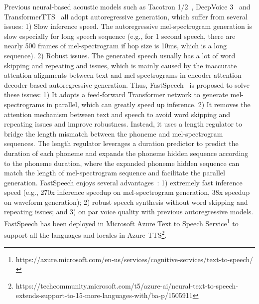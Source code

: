 \documentclass{article}
\begin{document}
Previous neural-based acoustic models such as Tacotron 1/2~\cite{wang2017tacotron,shen2018natural}, DeepVoice 3~\cite{ping2018deep} and TransformerTTS~\cite{li2019neural} all adopt autoregressive generation, which suffer from several issues: 1) Slow inference speed. The autoregressive mel-spectrogram generation is slow especially for long speech sequence (e.g., for 1 second speech, there are nearly 500 frames of mel-spectrogram if hop size is 10ms, which is a long sequence). 2) Robust issues. The generated speech usually has a lot of word skipping and repeating and issues, which is mainly caused by the inaccurate attention alignments between text and mel-spectrograms in encoder-attention-decoder based autoregressive generation. Thus, FastSpeech~\cite{ren2019fastspeech} is proposed to solve these issues: 1) It adopts a feed-forward Transformer network to generate mel-spectrograms in parallel, which can greatly speed up inference. 2) It removes the attention mechanism between text and speech to avoid word skipping and repeating issues and improve robustness. Instead, it uses a length regulator to bridge the length mismatch between the phoneme and mel-spectrogram sequences. The length regulator leverages a duration predictor to predict the duration of each phoneme and expands the phoneme hidden sequence according to the phoneme duration, where the expanded phoneme hidden sequence can match the length of mel-spectrogram sequence and facilitate the parallel generation. FastSpeech enjoys several advantages~\cite{ren2019fastspeech}: 1) extremely fast inference speed (e.g., 270x inference speedup on mel-spectrogram generation, 38x speedup on waveform generation); 2) robust speech synthesis without word skipping and repeating issues; and 3) on par voice quality with previous autoregressive models. FastSpeech has been deployed in Microsoft Azure Text to Speech Service\footnote{https://azure.microsoft.com/en-us/services/cognitive-services/text-to-speech/} to support all the languages and locales in Azure TTS\footnote{https://techcommunity.microsoft.com/t5/azure-ai/neural-text-to-speech-extends-support-to-15-more-languages-with/ba-p/1505911}. 
\end{document}
